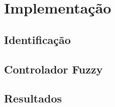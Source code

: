 %

\chapter{Implementação}
\label{capImp}
\section{Identificação}

\section{Controlador Fuzzy}

\section{Resultados}

%

